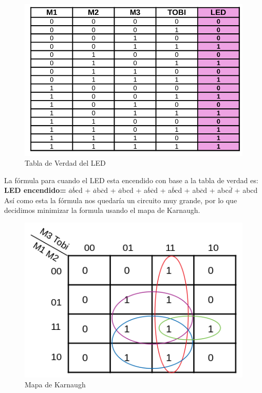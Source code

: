 \documentclass[11pt,letterpaper]{article}
\begin{document}
\begin{itemize}
	\begin{figure}[h]
		\centering
		\includegraphics[scale=0.26]{TablaVot.png}
		\caption{Tabla de Verdad del LED}
	\end{figure}

	La fórmula para cuando el LED esta encendido con base a la tabla de verdad es:\\

	\textbf{LED encendido=} $\overline{a}$$\overline{b}$cd + $\overline{a}$b$\overline{c}$d + $\overline{a}$bcd + a$\overline{b}$$\overline{c}$d + a$\overline{b}$cd + ab$\overline{c}$d + abc$\overline{d}$ + abcd\\
	
	Así como esta la fórmula nos quedaría un circuito muy grande, por lo que decidimos minimizar la formula usando el mapa de Karnaugh.
	
	\begin{figure}[h]
		\centering
		\includegraphics[scale=0.5]{Karnaugh.png}
		\caption{Mapa de Karnaugh}
	\end{figure}
	

\end{itemize}
\end{document}
